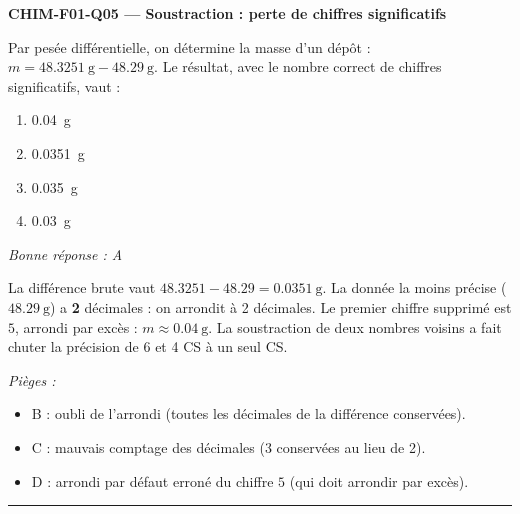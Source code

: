 \documentclass[11pt,a4paper]{article}
\begin{document}
\noindent\textbf{CHIM-F01-Q05 --- Soustraction : perte de chiffres significatifs}\par
Par pesée différentielle, on détermine la masse d'un dépôt : $m = \qty{48.3251}{\gram} - \qty{48.29}{\gram}$. Le résultat, avec le nombre correct de chiffres significatifs, vaut :
\begin{enumerate}[label=\Alph*)]
\item \qty{0.04}{\gram}
\item \qty{0.0351}{\gram}
\item \qty{0.035}{\gram}
\item \qty{0.03}{\gram}
\end{enumerate}
\textit{Bonne réponse : A}\par
La différence brute vaut $\num{48.3251}-\num{48.29} = \num{0.0351}\ \si{\gram}$. La donnée la moins précise ($\qty{48.29}{\gram}$) a \textbf{2} décimales : on arrondit à 2 décimales. Le premier chiffre supprimé est $5$, arrondi par excès : $m \approx \qty{0.04}{\gram}$. La soustraction de deux nombres voisins a fait chuter la précision de 6 et 4 CS à un seul CS.\par
\textit{Pièges :}
\begin{itemize}
\item B : oubli de l'arrondi (toutes les décimales de la différence conservées).
\item C : mauvais comptage des décimales (3 conservées au lieu de 2).
\item D : arrondi par défaut erroné du chiffre $5$ (qui doit arrondir par excès).
\end{itemize}
\vspace{6pt}\hrule\vspace{8pt}
\end{document}
